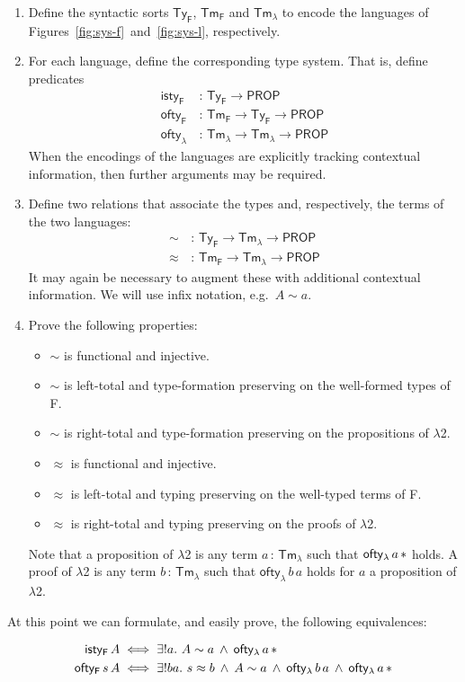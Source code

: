 \documentclass[a4paper,UKenglish]{lipics-v2016}
\newcommand{\ms}{\,}
\newcommand{\mrel}[1]{\mathrel{\ms #1 \ms}}
\newcommand{\Prop}{\ensuremath{\mathsf{PROP}}}
\newcommand{\OF}{\mrel{:}}
\newcommand{\mAnd}{\mrel{\wedge}}
\newcommand{\mExu}[1]{\ensuremath{\exists!} #1.\ms\ms}
\newcommand{\SysL}{$\lambda$2\xspace}
\newcommand{\TyF}{\ensuremath{\mathsf{Ty_{F}}}}
\newcommand{\TmF}{\ensuremath{\mathsf{Tm_{F}}}}
\newcommand{\TmL}{\ensuremath{\mathsf{Tm_{\lambda}}}}
\newcommand{\istyFpr}{\ensuremath{\mathsf{isty_{F}}}}
\newcommand{\typingFpr}{\ensuremath{\mathsf{ofty_{F}}}}
\newcommand{\typingLpr}{\ensuremath{\mathsf{ofty_{\lambda}}}}
\newcommand{\tyr}{\mathrel{\sim}}
\newcommand{\tmr}{\mathrel{\approx}}
\newcommand{\Prp}{\ensuremath{\textrm{\textasteriskcentered}}}
\begin{document}
\begin{enumerate}
\item Define the syntactic sorts $\TyF$, $\TmF$ and $\TmL$ to encode the languages of Figures~\ref{fig:sys-f}~and~\ref{fig:sys-l}, respectively.
\item For each language, define the corresponding type system.
  That is, define predicates
  \begin{align*}
    \istyFpr &\OF \TyF \to \Prop\\
    \typingFpr &\OF \TmF \to \TyF \to \Prop\\
    \typingLpr &\OF \TmL \to \TmL \to \Prop
  \end{align*}
  When the encodings of the languages are explicitly tracking contextual information, then further arguments may be required.
\item Define two relations that associate the types and, respectively, the terms of the two languages:
  \begin{align*}
    \tyr &\OF \TyF \to \TmL \to \Prop\\
    \tmr &\OF \TmF \to \TmL \to \Prop
  \end{align*}
  It may again be necessary to augment these with additional contextual information.
  We will use infix notation, e.g.\ $A \tyr a$.
\item Prove the following properties:
  \begin{itemize}
  \item $\tyr$ is functional and injective.
  \item $\tyr$ is left-total and type-formation preserving on the well-formed types of F.
  \item $\tyr$ is right-total and type-formation preserving on the propositions of \SysL.
  \item $\tmr$ is functional and injective.
  \item $\tmr$ is left-total and typing preserving on the well-typed terms of F.
  \item $\tmr$ is right-total and typing preserving on the proofs of \SysL.
  \end{itemize}
  Note that a proposition of \SysL is any term $a \OF \TmL$ such that $\typingLpr\,a\,\Prp$ holds.
  A proof of \SysL is any term $b \OF \TmL$ such that $\typingLpr\,b\,a$ holds for $a$ a proposition of \SysL.
\end{enumerate}
At this point we can formulate, and easily prove, the following equivalences:

\begin{theorem}[Reductions from F to \SysL]
  \begin{align*}
    \istyFpr\,A &\iff \mExu{a} A \tyr a \mAnd \typingLpr\,a\,\Prp\\
    \typingFpr\,s\,A &\iff \mExu{b a} s \tmr b \mAnd A \tyr a \mAnd \typingLpr\,b\,a \mAnd \typingLpr\,a\,\Prp
  \end{align*}
\end{theorem}
\end{document}
